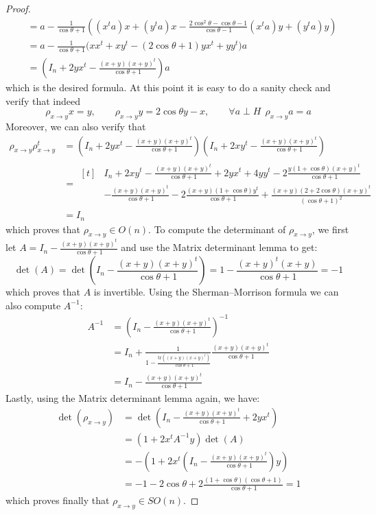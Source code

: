 \begin{proof}
\begin{align*}
&=a-\frac{1}{\cos\theta+1}\left((x^ta)x+(y^ta)x-\frac{2\cos^2\theta-\cos\theta-1}{\cos\theta-1}(x^ta)y+(y^ta)y\right)\\
&=a-\frac{1}{\cos\theta+1}\big(xx^t+xy^t-(2\cos\theta+1)yx^t+yy^t\big)a\\
&=\left(I_n+2yx^t-\frac{(x+y)(x+y)^t}{\cos\theta+1}\right)a
\end{align*}
\endgroup
which is the desired formula. At this point it is easy to do a sanity check and verify that indeed
\[\rho_{x\to y}x=y,\qquad\rho_{x\to y}y=2\cos\theta y-x,\qquad\forall a\perp H\ \ \rho_{x\to y}a=a\]
Moreover, we can also verify that
\begin{align*}
\rho_{x\to y}\rho_{x\to y}^t&=\left(I_n+2yx^t-\frac{(x+y)(x+y)^t}{\cos\theta+1}\right)\left(I_n+2xy^t-\frac{(x+y)(x+y)^t}{\cos\theta+1}\right)\\
&=\begin{aligned}[t]&I_n+2xy^t-\frac{(x+y)(x+y)^t}{\cos\theta+1}+2yx^t+4yy^t-2\frac{y(1+\cos\theta)(x+y)^t}{\cos\theta+1}\\
&-\frac{(x+y)(x+y)^t}{\cos\theta+1}-2\frac{(x+y)(1+\cos\theta)y^t}{\cos\theta+1}+\frac{(x+y)(2+2\cos\theta)(x+y)^t}{(\cos\theta+1)^2}\end{aligned}\\
&=I_n
\end{align*}
which proves that $\rho_{x\to y}\in O(n)$. To compute the determinant of $\rho_{x\to y}$, we first let $A=I_n-\frac{(x+y)(x+y)^t}{\cos\theta+1}$ and use the Matrix determinant lemma to get:
\[\det(A)=\det\left(I_n-\frac{(x+y)(x+y)^t}{\cos\theta+1}\right)=1-\frac{(x+y)^t(x+y)}{\cos\theta+1}=-1\]
which proves that $A$ is invertible. Using the Sherman–Morrison formula we can also compute $A^{-1}$:
\begin{align*}
A^{-1}&=\left(I_n-\frac{(x+y)(x+y)^t}{\cos\theta+1}\right)^{-1}\\
&=I_n+\frac{1}{1-\frac{\mathrm{tr}\left((x+y)(x+y)^t\right)}{\cos\theta+1}}\frac{(x+y)(x+y)^t}{\cos\theta+1}\\
&=I_n-\frac{(x+y)(x+y)^t}{\cos\theta+1}
\end{align*}
Lastly, using the Matrix determinant lemma again, we have:
\begin{align*}
\det(\rho_{x\to y})&=\det\left(I_n-\frac{(x+y)(x+y)^t}{\cos\theta+1}+2yx^t\right)\\
&=\left(1+2x^tA^{-1}y\right)\det(A)\\
&=-\left(1+2x^t\left(I_n-\frac{(x+y)(x+y)^t}{\cos\theta+1}\right)y\right)\\
&=-1-2\cos\theta+2\frac{(1+\cos\theta)(\cos\theta+1)}{\cos\theta+1}=1
\end{align*}
which proves finally that $\rho_{x\to y}\in SO(n)$.
\end{proof}

